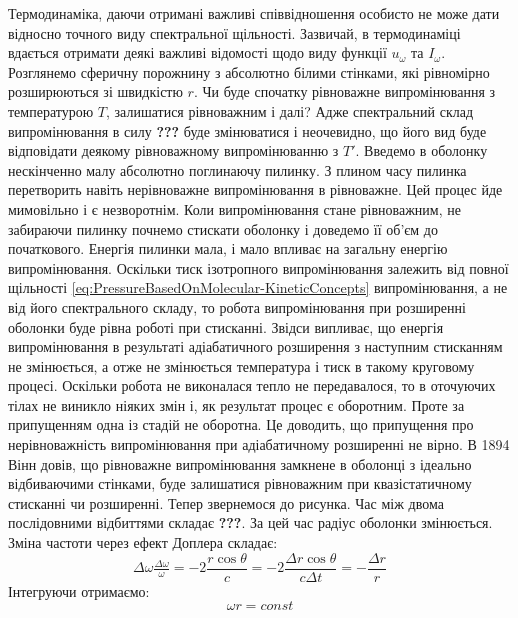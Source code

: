 \documentclass{article}
\begin{document}
\Task{}Термодинаміка, даючи отримані важливі співвідношення особисто не може дати відносно точного виду спектральної щільності. Зазвичай, в термодинаміці вдається отримати деякі важливі відомості щодо виду функції $u_{\omega}$ та 
$I_{\omega}$. \vspace{5mm} \\
Розглянемо сферичну порожнину з абсолютно білими стінками, які рівномірно розширюються зі швидкістю $r$. Чи буде спочатку рівноважне випромінювання з температурою $T$, залишатися рівноважним і далі? Адже спектральний склад 
випромінювання в силу \textbf{???} буде змінюватися і неочевидно, що його вид буде відповідати деякому рівноважному випромінюванню з $T'$. Введемо в оболонку нескінченно малу абсолютно поглинаючу пилинку. З плином часу пилинка 
перетворить навіть нерівноважне випромінювання в рівноважне. Цей процес йде мимовільно і є незворотнім. Коли випромінювання стане рівноважним, не забираючи пилинку почнемо стискати оболонку і доведемо її об’єм до початкового. 
Енергія пилинки мала, і мало впливає на загальну енергію випромінювання. Оскільки тиск ізотропного випромінювання залежить від повної щільності \eqref{eq:PressureBasedOnMolecular-KineticConcepts} випромінювання, а не від його 
спектрального складу, то робота випромінювання при розширенні оболонки буде рівна роботі при стисканні. Звідси випливає, що енергія випромінювання в результаті адіабатичного розширення з наступним стисканням не змінюється, а 
отже не змінюється температура і тиск в такому круговому процесі. Оскільки робота не виконалася тепло не передавалося, то в оточуючих тілах не виникло ніяких змін і, як результат процес є оборотним. Проте за припущенням одна 
із стадій не оборотна. Це доводить, що припущення про нерівноважність випромінювання при адіабатичному розширенні не вірно. В 1894 Вінн довів, що рівноважне випромінювання замкнене в оболонці з ідеально відбиваючими стінками, 
буде залишатися рівноважним при квазістатичному стисканні чи розширенні. Тепер звернемося до рисунка. Час між двома послідовними відбиттями складає \textbf{???}. За цей час радіус оболонки змінюється. Зміна частоти через ефект 
Доплера складає:
\begin{equation}
    \label{eq:FrequencyShift_due_to_DopplerEffect}
    \Delta \omega \tfrac{\Delta \omega}{\omega} = -2\frac{r \cos{\theta}}{c} = - 2 \frac{\Delta r \cos{\theta}}{c \Delta t} = - \frac{\Delta r}{r}
\end{equation}
Інтегруючи отримаємо:
\begin{equation}
    \label{eq:FrequencyShift_Integrated}
    \omega r = const
\end{equation}
\end{document}
